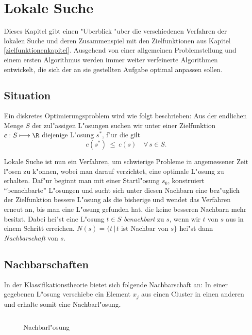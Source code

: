 \chapter{Lokale Suche}
\label{lokalesuche}
Dieses Kapitel gibt einen "Uberblick "uber die verschiedenen Verfahren
der lokalen Suche und deren Zusammenspiel mit den Zielfunktionen aus
Kapitel \ref{zielfunktionenkapitel}. Ausgehend von einer allgemeinen
Problemstellung und einem ersten Algorithmus werden immer weiter
verfeinerte Algorithmen entwickelt, die sich der an sie gestellten
Aufgabe optimal anpassen sollen.

\section{Situation}
Ein diskretes Optimierungsproblem wird wie folgt beschrieben:
Aus der endlichen Menge $S$ der zul"assigen L"osungen suchen wir 
unter einer Zielfunktion $c:S \longmapsto \R$ diejenige L"osung
$s^*$, f"ur die gilt
\begin{equation}
	c(s^*) \ \leq\  c(s) \quad \forall\, s \in S.
\end{equation}

Lokale Suche ist nun ein Verfahren, um schwierige Probleme
in angemessener Zeit l"osen zu k"onnen, wobei man darauf verzichtet, 
eine optimale L"osung zu erhalten.
Daf"ur beginnt man mit einer Startl"osung $s_0$, konstruiert 
"`benachbarte"' L"osungen und sucht sich unter diesen Nachbarn eine
bez"uglich der Zielfunktion bessere L"osung als die bisherige und wendet
das Verfahren erneut an, bis man eine L"osung gefunden hat, die keine
besseren Nachbarn mehr besitzt. Dabei hei"st eine L"osung $t \in S$ {\em 
benachbart} zu $s$, wenn wir $t$ von $s$ aus in einem Schritt erreichen.
$N(s) = \{ t \,|\, t$ ist Nachbar von $s \}$ hei"st dann {\em Nachbarschaft}
von $s$.

\section{Nachbarschaften}
\label{nachbarn}
In der Klassifikationstheorie bietet sich folgende Nachbarschaft an:
In einer gegebenen L"osung verschiebe ein Element $x_j$ aus einen Cluster
in einen anderen und erhalte somit eine Nachbarl"osung.

\begin{figure}[htp]
\[

\]
\caption{Nachbarl"osung}
\end{figure}

